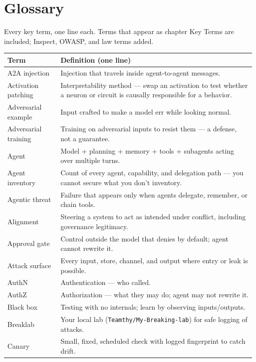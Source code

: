 \chapter*{Glossary}
{\small Every key term, one line each. Terms that appear as chapter Key Terms are included; Inspect, OWASP, and law terms added.}

\begin{center}
\begin{tabularx}{\linewidth}{lX}
\toprule
Term & Definition (one line) \\
\midrule
A2A injection & Injection that travels inside agent-to-agent messages. \\
Activation patching & Interpretability method — swap an activation to test whether a neuron or circuit is causally responsible for a behavior. \\
Adversarial example & Input crafted to make a model err while looking normal. \\
Adversarial training & Training on adversarial inputs to resist them — a defense, not a guarantee. \\
Agent & Model + planning + memory + tools + subagents acting over multiple turns. \\
Agent inventory & Count of every agent, capability, and delegation path — you cannot secure what you don't inventory. \\
Agentic threat & Failure that appears only when agents delegate, remember, or chain tools. \\
Alignment & Steering a system to act as intended under conflict, including governance legitimacy. \\
Approval gate & Control outside the model that denies by default; agent cannot rewrite it. \\
Attack surface & Every input, store, channel, and output where entry or leak is possible. \\
AuthN & Authentication — who called. \\
AuthZ & Authorization — what they may do; agent may not rewrite it. \\
Black box & Testing with no internals; learn by observing inputs/outputs. \\
Breaklab & Your local lab (\texttt{Teamthy/My-Breaking-lab}) for safe logging of attacks. \\
Canary & Small, fixed, scheduled check with logged fingerprint to catch drift. \\

\end{tabularx}
\end{center}
